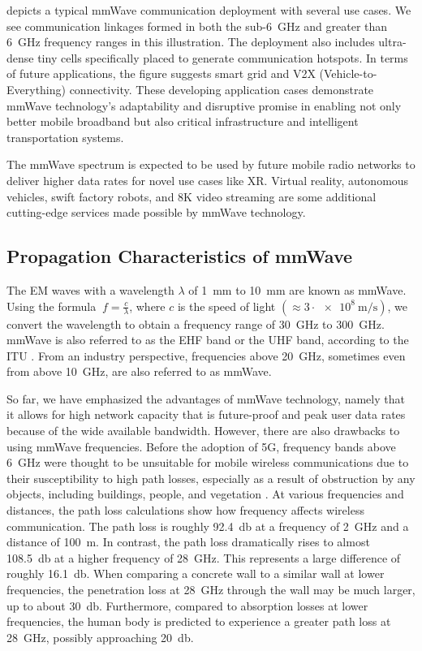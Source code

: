  depicts a typical mmWave communication deployment with several use cases. We see communication linkages formed in both the sub-\SI{6}{\giga\hertz} and greater than \SI{6}{\giga\hertz} frequency ranges in this illustration. The deployment also includes ultra-dense tiny cells specifically placed to generate communication hotspots. In terms of future applications, the figure suggests smart grid and V2X (Vehicle-to-Everything) connectivity. These developing application cases demonstrate mmWave technology's adaptability and disruptive promise in enabling not only better mobile broadband but also critical infrastructure and intelligent transportation systems.

The \ac{mmWave} spectrum is expected to be used by future mobile radio networks to deliver higher data rates for novel use cases like \ac{XR}. Virtual reality, autonomous vehicles, swift factory robots, and 8K video streaming are some additional cutting-edge services made possible by \ac{mmWave} technology.
\subsection{Propagation Characteristics of mmWave} \label{Characteristics of 5G mmWave}
The \ac{EM} waves with a wavelength $\lambda$ of \SI{1}{\milli\meter} to \SI{10}{\milli\meter} are known as \ac{mmWave}. Using the formula $\ f = \frac{c}{\lambda}$, where $c$ is the speed of light $ (\approx \num{3} \cdot \SI{e8}{\meter}/\si{\second})$, we convert the wavelength to obtain a frequency range of \SI{30}{\giga\hertz} to \SI{300}{\giga\hertz}. \ac{mmWave} is also referred to as the \ac{EHF} band or the \ac{UHF} band, according to the \ac{ITU} \cite{ITU_EHF}. From an industry perspective, frequencies above \SI{20}{\giga\hertz}, sometimes even from above \SI{10}{\giga\hertz}, are also referred to as \ac{mmWave}.

So far, we have emphasized the advantages of \ac{mmWave} technology, namely that it allows for high network capacity that is future-proof and peak user data rates because of the wide available bandwidth. However, there are also drawbacks to using \ac{mmWave} frequencies. Before the adoption of 5G, frequency bands above \SI{6}{\giga\hertz} were thought to be unsuitable for mobile wireless communications due to their susceptibility to high path losses, especially as a result of obstruction by any objects, including buildings, people, and vegetation \cite{6GWireless}. At various frequencies and distances, the path loss calculations show how frequency affects wireless communication. The path loss is roughly \SI{92.4}{\decibel} at a frequency of \SI{2}{\giga\hertz} and a distance of \SI{100}{\meter}. In contrast, the path loss dramatically rises to almost \SI{108.5}{\decibel} at a higher frequency of \SI{28}{\giga\hertz}. This represents a large difference of roughly \SI{16.1}{\decibel}. When comparing a concrete wall to a similar wall at lower frequencies, the penetration loss at \SI{28}{\giga\hertz} through the wall may be much larger, up to about \SI{30}{\decibel}. Furthermore, compared to absorption losses at lower frequencies, the human body is predicted to experience a greater path loss at \SI{28}{\giga\hertz}, possibly approaching \SI{20}{\decibel}.

